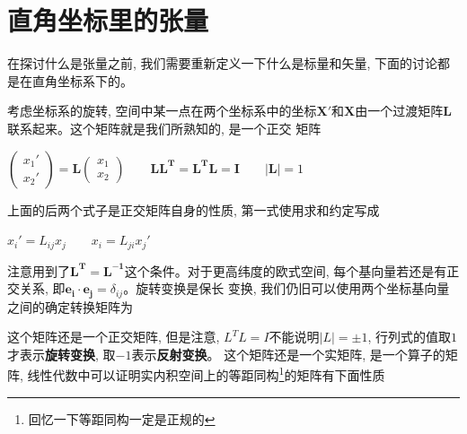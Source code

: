 \section{直角坐标里的张量}
在探讨什么是张量之前, 我们需要重新定义一下什么是标量和矢量, 下面的讨论都是在直角坐标系下的。

考虑坐标系的旋转, 空间中某一点在两个坐标系中的坐标$\bm{X'}$和$\bm{X}$由一个过渡矩阵$\bm{L}$联系起来。这个矩阵就是我们所熟知的, 是一个正交
矩阵
\begin{lequation}
\end{lequation}
\begin{center}
    \begin{math}
        \displaystyle
        \begin{pmatrix}
            x_1' \\
            x_2'
        \end{pmatrix}
        =\bm{L}
        \begin{pmatrix}
            x_1\\
            x_2
        \end{pmatrix}
        \qquad
        \bm{L}\bm{L^T}=\bm{L^T}\bm{L}=\bm{I}
        \qquad
        \left|\bm{L}\right|=1
    \end{math}
\end{center}
上面的后两个式子是正交矩阵自身的性质, 第一式使用求和约定写成
\begin{center}
    \begin{math}
        \displaystyle
        x_i'=L_{ij}x_j\qquad
        x_i =L_{ji}x_j'
    \end{math}
\end{center}
注意用到了$\bm{L^T}=\bm{L^{-1}}$这个条件。对于更高纬度的欧式空间, 每个基向量若还是有正交关系, 即$\bm{e_i}\cdot\bm{e_j}=\delta_{ij}$。旋转变换是保长
变换, 我们仍旧可以使用两个坐标基向量之间的确定转换矩阵为
\begin{lequation}
\end{lequation}
这个矩阵还是一个正交矩阵, 但是注意, $L^TL=I$不能说明$\left|L\right|=\pm 1$, 行列式的值取$1$才表示\textbf{旋转变换}, 取$-1$表示\textbf{反射变换}。
这个矩阵还是一个实矩阵, 是一个算子的矩阵, 线性代数中可以证明实内积空间上的等距同构\footnote[1]{回忆一下等距同构一定是正规的}的矩阵有下面性质
